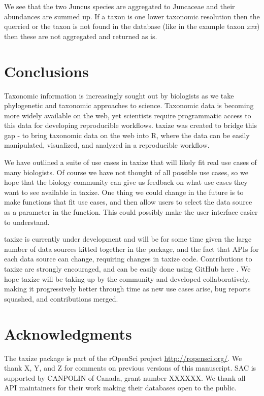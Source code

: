 \documentclass[10pt]{article}\usepackage[]{graphicx}\usepackage[]{color}
\begin{document}
We see that the two Juncus species are aggregated to Juncaceae and their abundances are summed up. If a taxon is one lower taxonomic resolution then the querried or the taxon is not found in the database (like in the example taxon \emph{xxx}) then these are not aggregated and returned as is.


\section*{Conclusions}
Taxonomic information is increasingly sought out by biologists as we take phylogenetic and taxonomic approaches to science. Taxonomic data is becoming more widely available on the web, yet scientists require programmatic access to this data for developing reproducible workflows. taxize was created to bridge this gap - to bring taxonomic data on the web into R, where the data can be easily manipulated, visualized, and analyzed in a reproducible workflow.

We have outlined a suite of use cases in taxize that will likely fit real use cases of many biologists. Of course we have not thought of all possible use cases, so we hope that the biology community can give us feedback on what use cases they want to see available in taxize. One thing we could change in the future is to make functions that fit use cases, and then allow users to select the data source as a parameter in the function. This could possibly make the user interface easier to understand.

taxize is currently under development and will be for some time given the large number of data sources kitted together in the package, and the fact that APIs for each data source can change, requiring changes in taxize code. Contributions to taxize are strongly encouraged, and can be easily done using GitHub here \cite{github_taxize}. We hope taxize will be taking up by the community and developed collaboratively, making it progressively better through time as new use cases arise, bug reports squashed, and contributions merged.


\section*{Acknowledgments}
The taxize package is part of the rOpenSci project \url{http://ropensci.org/}. We thank X, Y, and Z for comments on previous versions of this manuscript. SAC is supported by CANPOLIN of Canada, grant number XXXXXX. We thank all API maintainers for their work making their databases open to the public.
\end{document}
